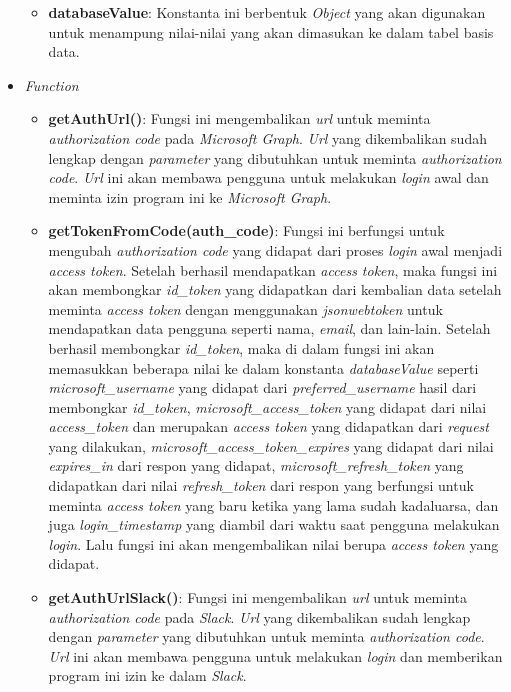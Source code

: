 \begin{itemize}
\begin{itemize}
        \item \textbf{databaseValue}: Konstanta ini berbentuk \textit{Object} yang akan digunakan untuk menampung nilai-nilai yang akan dimasukan ke dalam tabel basis data. 
    \end{itemize}
    \item \textit{Function}
    \begin{itemize}
        \item \textbf{getAuthUrl()}: Fungsi ini mengembalikan \textit{url} untuk meminta \textit{authorization code} pada \textit{Microsoft Graph}. \textit{Url} yang dikembalikan sudah lengkap dengan \textit{parameter} yang dibutuhkan untuk meminta \textit{authorization code}. \textit{Url} ini akan membawa pengguna untuk melakukan \textit{login} awal dan meminta izin program ini ke \textit{Microsoft Graph}. 
        \item \textbf{getTokenFromCode(auth\_code)}: Fungsi ini berfungsi untuk mengubah \textit{authorization code} yang didapat dari proses \textit{login} awal menjadi \textit{access token}. Setelah berhasil mendapatkan \textit{access token}, maka fungsi ini akan membongkar \textit{id\_token} yang didapatkan dari kembalian data setelah meminta \textit{access token} dengan menggunakan \textit{jsonwebtoken} untuk mendapatkan data pengguna seperti nama, \textit{email}, dan lain-lain. Setelah berhasil membongkar \textit{id\_token}, maka di dalam fungsi ini akan memasukkan beberapa nilai ke dalam konstanta \textit{databaseValue} seperti \textit{microsoft\_username} yang didapat dari \textit{preferred\_username} hasil dari membongkar \textit{id\_token}, \textit{microsoft\_access\_token} yang didapat dari nilai \textit{access\_token} dan merupakan \textit{access token} yang didapatkan dari \textit{request} yang dilakukan, \textit{microsoft\_access\_token\_expires} yang didapat dari nilai \textit{expires\_in} dari respon yang didapat, \textit{microsoft\_refresh\_token} yang didapatkan dari nilai \textit{refresh\_token} dari respon yang berfungsi untuk meminta \textit{access token} yang baru ketika yang lama sudah kadaluarsa, dan juga \textit{login\_timestamp} yang diambil dari waktu saat pengguna melakukan \textit{login}. Lalu fungsi ini akan mengembalikan nilai berupa \textit{access token} yang didapat. 
        \item \textbf{getAuthUrlSlack()}: Fungsi ini mengembalikan \textit{url} untuk meminta \textit{authorization code} pada \textit{Slack}. \textit{Url} yang dikembalikan sudah lengkap dengan \textit{parameter} yang dibutuhkan untuk meminta \textit{authorization code}. \textit{Url} ini akan membawa pengguna untuk melakukan \textit{login} dan memberikan program ini izin ke dalam \textit{Slack}. 

\end{itemize}
\end{itemize}

